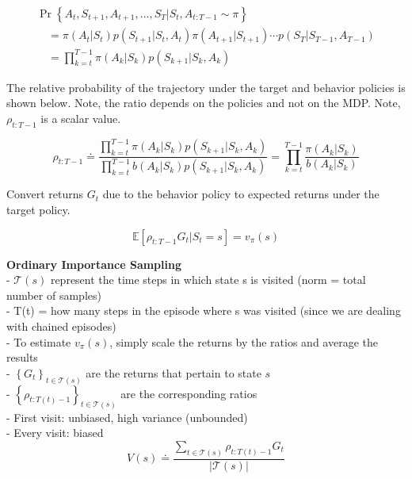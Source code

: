 \documentclass{article}
\begin{document}
\begin{equation}
\begin{array}{l}
\operatorname{Pr}\left\{A_{t}, S_{t+1}, A_{t+1}, \ldots, S_{T} | S_{t}, A_{t: T-1} \sim \pi\right\} \\
\quad=\pi\left(A_{t} | S_{t}\right) p\left(S_{t+1} | S_{t}, A_{t}\right) \pi\left(A_{t+1} | S_{t+1}\right) \cdots p\left(S_{T} | S_{T-1}, A_{T-1}\right) \\
\quad=\prod_{k=t}^{T-1} \pi\left(A_{k} | S_{k}\right) p\left(S_{k+1} | S_{k}, A_{k}\right)
\end{array}
\end{equation}

\newpage
\noindent
The relative probability of the trajectory under the target and behavior
policies is shown below. Note, the ratio depends on the policies and not on the
MDP. Note, $\rho_{t: T-1}$ is a scalar value.

\begin{equation}
\rho_{t: T-1} \doteq \frac{\prod_{k=t}^{T-1} \pi\left(A_{k} | S_{k}\right) p\left(S_{k+1} | S_{k}, A_{k}\right)}{\prod_{k=t}^{T-1} b\left(A_{k} | S_{k}\right) p\left(S_{k+1} | S_{k}, A_{k}\right)}=\prod_{k=t}^{T-1} \frac{\pi\left(A_{k} | S_{k}\right)}{b\left(A_{k} | S_{k}\right)}
\end{equation}

\noindent
Convert returns $G_{t}$ due to the behavior policy to expected returns under the
target policy.

\begin{equation}
\mathbb{E}\left[\rho_{t: T-1} G_{t} | S_{t}=s\right]=v_{\pi}(s)
\end{equation}

\noindent
\textbf{Ordinary Importance Sampling}\\
- $\mathcal{T}(s)$ represent the time steps in which state s is visited (norm =
total number of samples)\\
- T(t) = how many steps in the episode where s was visited (since we are dealing
with chained episodes) \\
- To estimate $v_{\pi}(s)$, simply scale the returns by the ratios and average
the results\\
- $\left\{G_{t}\right\}_{t \in \mathcal{T}(s)}$ are the returns that pertain to
state $s$ \\
- $\left\{\rho_{t: T(t)-1}\right\}_{t \in \mathcal{T}(s)}$ are the corresponding
ratios\\
- First visit: unbiased, high variance (unbounded)\\
- Every visit: biased
\begin{equation}
V(s) \doteq \frac{\sum_{t \in \mathcal{T}(s)} \rho_{t: T(t)-1} G_{t}}{|\mathcal{T}(s)|}
\end{equation}
\end{document}

